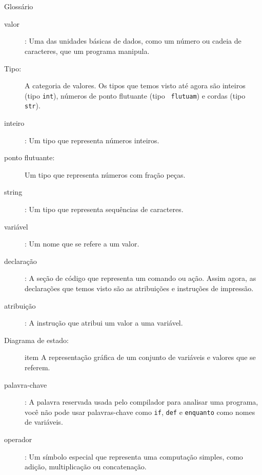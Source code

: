 \documentclass[10pt]{book}
\begin{document}
\section{} Glossário

\begin{description}

\item[valor]: Uma das unidades básicas de dados, como um número ou cadeia de caracteres, 
que um programa manipula.

\item[Tipo:] A categoria de valores. Os tipos que temos visto até agora
são inteiros (tipo {\tt int}), números de ponto flutuante (tipo {\tt
flutuam}) e cordas (tipo {\tt str}).

\item[inteiro]: Um tipo que representa números inteiros.

\item[ponto flutuante:] Um tipo que representa números com fração
peças.

\item[string]: Um tipo que representa sequências de caracteres.

\item[variável]: Um nome que se refere a um valor.

\item[declaração]: A seção de código que representa um comando ou ação. Assim
agora, as declarações que temos visto são as atribuições e instruções de impressão.

\item[atribuição]: A instrução que atribui um valor a uma variável.

\item[Diagrama de estado:] item A representação gráfica de um conjunto de variáveis ​​e
valores que se referem.

\item[palavra-chave]: A palavra reservada usada pelo compilador para analisar uma
programa, você não pode usar palavras-chave como {\tt if}, {\tt def} e {\tt enquanto} como
nomes de variáveis.

\item[operador]: Um símbolo especial que representa uma computação simples, como
adição, multiplicação ou concatenação.


\end{description}
\end{document}
